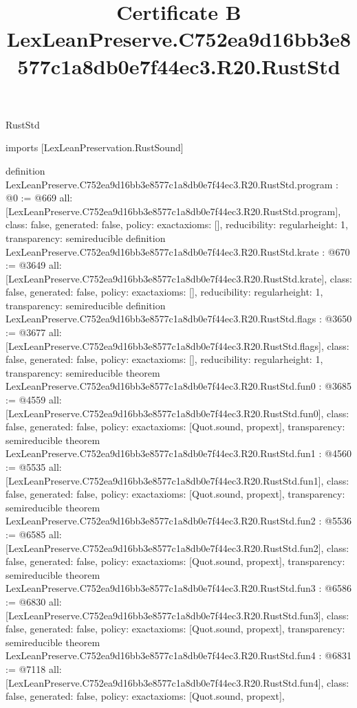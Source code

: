 \begin{lexlean}{RustStd}
\title{Certificate B LexLeanPreserve.C752ea9d16bb3e8577c1a8db0e7f44ec3.R20.RustStd}
\begin{coremodule}
imports [LexLeanPreservation.RustSound]

definition LexLeanPreserve.C752ea9d16bb3e8577c1a8db0e7f44ec3.R20.RustStd.program : @0 := @669 {
  all: [LexLeanPreserve.C752ea9d16bb3e8577c1a8db0e7f44ec3.R20.RustStd.program],
  class: false,
  generated: false,
  policy: exact{axioms: []},
  reducibility: regular{height: 1},
  transparency: semireducible
}
definition LexLeanPreserve.C752ea9d16bb3e8577c1a8db0e7f44ec3.R20.RustStd.krate : @670 := @3649 {
  all: [LexLeanPreserve.C752ea9d16bb3e8577c1a8db0e7f44ec3.R20.RustStd.krate],
  class: false,
  generated: false,
  policy: exact{axioms: []},
  reducibility: regular{height: 1},
  transparency: semireducible
}
definition LexLeanPreserve.C752ea9d16bb3e8577c1a8db0e7f44ec3.R20.RustStd.flags : @3650 := @3677 {
  all: [LexLeanPreserve.C752ea9d16bb3e8577c1a8db0e7f44ec3.R20.RustStd.flags],
  class: false,
  generated: false,
  policy: exact{axioms: []},
  reducibility: regular{height: 1},
  transparency: semireducible
}
theorem LexLeanPreserve.C752ea9d16bb3e8577c1a8db0e7f44ec3.R20.RustStd.fun0 : @3685 := @4559 {
  all: [LexLeanPreserve.C752ea9d16bb3e8577c1a8db0e7f44ec3.R20.RustStd.fun0],
  class: false,
  generated: false,
  policy: exact{axioms: [Quot.sound, propext]},
  transparency: semireducible
}
theorem LexLeanPreserve.C752ea9d16bb3e8577c1a8db0e7f44ec3.R20.RustStd.fun1 : @4560 := @5535 {
  all: [LexLeanPreserve.C752ea9d16bb3e8577c1a8db0e7f44ec3.R20.RustStd.fun1],
  class: false,
  generated: false,
  policy: exact{axioms: [Quot.sound, propext]},
  transparency: semireducible
}
theorem LexLeanPreserve.C752ea9d16bb3e8577c1a8db0e7f44ec3.R20.RustStd.fun2 : @5536 := @6585 {
  all: [LexLeanPreserve.C752ea9d16bb3e8577c1a8db0e7f44ec3.R20.RustStd.fun2],
  class: false,
  generated: false,
  policy: exact{axioms: [Quot.sound, propext]},
  transparency: semireducible
}
theorem LexLeanPreserve.C752ea9d16bb3e8577c1a8db0e7f44ec3.R20.RustStd.fun3 : @6586 := @6830 {
  all: [LexLeanPreserve.C752ea9d16bb3e8577c1a8db0e7f44ec3.R20.RustStd.fun3],
  class: false,
  generated: false,
  policy: exact{axioms: [Quot.sound, propext]},
  transparency: semireducible
}
theorem LexLeanPreserve.C752ea9d16bb3e8577c1a8db0e7f44ec3.R20.RustStd.fun4 : @6831 := @7118 {
  all: [LexLeanPreserve.C752ea9d16bb3e8577c1a8db0e7f44ec3.R20.RustStd.fun4],
  class: false,
  generated: false,
  policy: exact{axioms: [Quot.sound, propext]},
}
\end{coremodule}
\end{lexlean}
